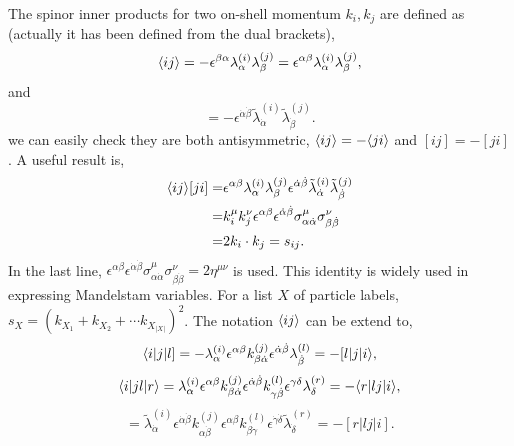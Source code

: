 \documentclass[a4paper,11pt]{article}
\begin{document}
The spinor inner products for two on-shell momentum $k_i,k_j$ are defined as (actually it has been defined from the dual brackets),
\begin{equation}
    \langle ij \rangle=-\epsilon^{\beta \alpha}\lambda^{(i)}_{\alpha}\lambda^{(j)}_{\beta}=\epsilon^{\alpha\beta}\lambda^{(i)}_{\alpha}\lambda^{(j)}_{\beta},
\end{equation}
and
\begin{equation}
    [ij]=-\epsilon^{\dot{\alpha}\dot{\beta}}\tilde{\lambda}^{(i)}_{\dot{\alpha}}\tilde{\lambda}^{(j)}_{\dot{\beta}}.
\end{equation}
we can easily check they are both antisymmetric, $\langle ij \rangle=-\langle ji \rangle$ and $[ij]=-[ji]$. A useful result is,
\begin{equation}
    \begin{split}
        \langle ij \rangle[ji]=&\epsilon^{\alpha\beta}\lambda^{(i)}_{\alpha}\lambda^{(j)}_{\beta}\epsilon^{\dot{\alpha}\dot{\beta}}\tilde{\lambda}^{(i)}_{\dot{\alpha}}\tilde{\lambda}^{(j)}_{\dot{\beta}}\\
        =& k_i^\mu k_j^\nu \epsilon^{\alpha\beta}\epsilon^{\dot{\alpha}\dot{\beta}}\sigma^{\mu}_{\alpha\dot{\alpha}}\sigma^{\nu}_{\beta\dot \beta}\\
        =&2k_i\cdot k_j=s_{ij}.
    \end{split}
\end{equation}
In the last line, $\epsilon^{\alpha\beta}\epsilon^{\dot{\alpha}\dot{\beta}}\sigma^{\mu}_{\alpha\dot{\alpha}}\sigma^{\nu}_{\beta\dot \beta}=2\eta^{\mu \nu}$ is used. This identity is widely used in expressing Mandelstam variables. 
For a list $X$ of particle labels, $s_X=(k_{X_1}+k_{X_2}+\cdots k_{X_{|X|}})^2$. 
The notation $\langle ij \rangle$ can be extend to,
\begin{equation}
    \langle i|j|l]=-\lambda_{\alpha}^{(i)}\epsilon^{\alpha\beta}k_{\beta\dot{\alpha}}^{(j)}\epsilon^{\dot{\alpha}\dot{\beta}}\lambda_{\dot{\beta}}^{(l)}=-[l|j|i\rangle,
\end{equation}
\begin{equation}
    \langle i|jl|r \rangle=\lambda_{\alpha}^{(i)}\epsilon^{\alpha\beta}k_{\beta\dot{\alpha}}^{(j)}\epsilon^{\dot{\alpha}\dot{\beta}}k_{\gamma\dot{\beta}}^{(l)}\epsilon^{\gamma\delta}\lambda_{\delta}^{(r)}=-\langle r|lj|i \rangle,
\end{equation}
\begin{equation}
    [i|jl|r]=\tilde{\lambda}_{\dot{\alpha}}^{(i)}\epsilon^{\dot{\alpha}\dot{\beta}}k_{\alpha\dot{\beta}}^{(j)}\epsilon^{\alpha\beta}k_{\beta\dot{\gamma}}^{(l)}\epsilon^{\dot{\gamma}\dot{\delta}}\tilde{\lambda}_{\dot{\delta}}^{(r)}=-[r|lj|i].
\end{equation}
\end{document}
